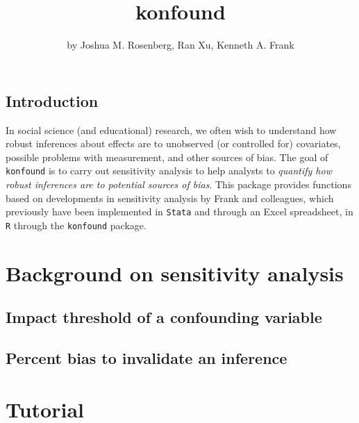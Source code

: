 \title{konfound}
\author{by Joshua M. Rosenberg, Ran Xu, Kenneth A. Frank}

\maketitle



\hypertarget{introduction}{%
\subsection{Introduction}\label{introduction}}

In social science (and educational) research, we often wish to
understand how robust inferences about effects are to unobserved (or
controlled for) covariates, possible problems with measurement, and
other sources of bias. The goal of \texttt{konfound} is to carry out
sensitivity analysis to help analysts to \emph{quantify how robust
inferences are to potential sources of bias}. This package provides
functions based on developments in sensitivity analysis by Frank and
colleagues, which previously have been implemented in \texttt{Stata} and
through an Excel spreadsheet, in \texttt{R} through the
\texttt{konfound} package.

\hypertarget{background-on-sensitivity-analysis}{%
\section{Background on sensitivity
analysis}\label{background-on-sensitivity-analysis}}

\hypertarget{impact-threshold-of-a-confounding-variable}{%
\subsection{Impact threshold of a confounding
variable}\label{impact-threshold-of-a-confounding-variable}}

\hypertarget{percent-bias-to-invalidate-an-inference}{%
\subsection{Percent bias to invalidate an
inference}\label{percent-bias-to-invalidate-an-inference}}

\hypertarget{tutorial}{%
\section{Tutorial}\label{tutorial}}

